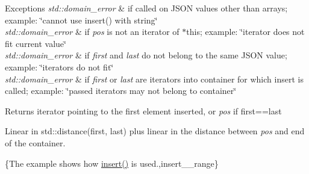 \begin{DoxyExceptions}{Exceptions}
{\em std\-::domain\-\_\-error} & if called on J\-S\-O\-N values other than arrays; example\-: {\ttfamily \char`\"{}cannot use insert() with string\char`\"{}} \\
\hline
{\em std\-::domain\-\_\-error} & if {\itshape pos} is not an iterator of $\ast$this; example\-: {\ttfamily \char`\"{}iterator does not fit current value\char`\"{}} \\
\hline
{\em std\-::domain\-\_\-error} & if {\itshape first} and {\itshape last} do not belong to the same J\-S\-O\-N value; example\-: {\ttfamily \char`\"{}iterators do not fit\char`\"{}} \\
\hline
{\em std\-::domain\-\_\-error} & if {\itshape first} or {\itshape last} are iterators into container for which insert is called; example\-: {\ttfamily \char`\"{}passed iterators may not
belong to container\char`\"{}}\\
\hline
\end{DoxyExceptions}
\begin{DoxyReturn}{Returns}
iterator pointing to the first element inserted, or {\itshape pos} if {\ttfamily first==last}
\end{DoxyReturn}
Linear in {\ttfamily std\-::distance(first, last)} plus linear in the distance between {\itshape pos} and end of the container.

\{The example shows how {\ttfamily \hyperlink{classnlohmann_1_1basic__json_a7f7bbb3a9efef2e2442f538a24c1c47b}{insert()}} is used.,insert\-\_\-\-\_\-range\}

